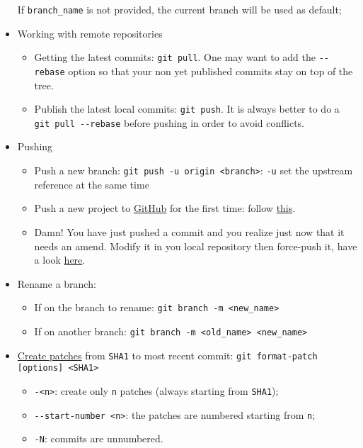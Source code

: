 \documentclass[a4paper,12pt,%
              final%
              ]{article}
\begin{document}
\begin{itemize}
    If \verb|branch_name| is not provided, the current branch will be used as default;
  \item Working with remote repositories
    \begin{itemize}
      \item Getting the latest commits: \verb|git pull|. One may want to add the \verb|--rebase| option so that your non yet published commits stay on top of the tree.
      \item Publish the latest local commits: \verb|git push|. It is always better to do a \verb|git pull --rebase| before pushing in order to avoid conflicts.
    \end{itemize}
  \item Pushing
    \begin{itemize}
      \item Push a new branch: \verb|git push -u origin <branch>|: \verb|-u| set the upstream reference at the same time
      \item Push a new project to \href{https://github.com/}{GitHub} for the first time: follow \href{https://help.github.com/en/github/importing-your-projects-to-github/adding-an-existing-project-to-github-using-the-command-line}{this}.
      \item Damn! You have just pushed a commit and you realize just now that it needs an amend. Modify it in you local repository then force-push it, have a look \href{https://stackoverflow.com/questions/179123/how-to-modify-existing-unpushed-commit-messages}{here}.
    \end{itemize}
  \item Rename a branch:
    \begin{itemize}
      \item If on the branch to rename: \verb|git branch -m <new_name>|
      \item If on another branch: \verb|git branch -m <old_name> <new_name>|
    \end{itemize}
  \item \href{https://git-scm.com/docs/git-format-patch}{Create patches} from \texttt{SHA1} to most recent commit: \verb|git format-patch [options] <SHA1>|
    \begin{itemize}
      \item \texttt{-<n>}: create only \texttt{n} patches (always starting from \texttt{SHA1});
      \item \verb|--start-number <n>|: the patches are numbered starting from \texttt{n};
      \item \texttt{-N}: commits are unnumbered.

\end{itemize}
\end{itemize}
\end{document}
